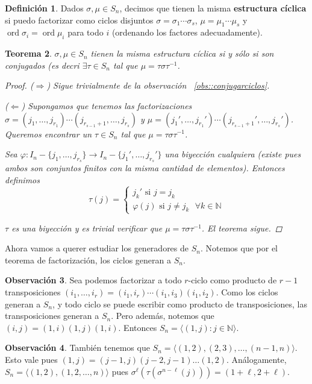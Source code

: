\documentclass[12pt]{book}
\newtheorem{teo}{Teorema}[section]
\theoremstyle{definition}
\newtheorem{obs}[teo]{Observación}
\newtheorem{defn}[teo]{Definición}
\newcommand{\NN}{\mathbb{N}}
\DeclareMathOperator{\ord}{ord}
\begin{document}
\begin{defn}
Dados $\sigma,\mu\in S_n$, decimos que tienen la misma \textbf{estructura cíclica} si puedo factorizar como ciclos disjuntos $\sigma = \sigma_1\cdots \sigma_s$, $\mu = \mu_1\cdots \mu_s$ y $\ord \sigma_i = \ord \mu_i$ para todo $i$ (ordenando los factores adecuadamente).
\end{defn}

\begin{teo}
$\sigma,\mu\in S_n$ tienen la misma estructura cíclica si y sólo si son conjugados (es decri $\exists \tau\in S_n$ tal que $\mu = \tau\sigma\tau^{-1}$.
\begin{proof}
($\Longrightarrow$) Sigue trivialmente de la observación ~\ref{obs::conjugarciclos}.

($\Longleftarrow$) Supongamos que tenemos las factorizaciones $\sigma = (j_1,\ldots , j_{r_1})\cdots (j_{r_{s-1}+1},\ldots , j_{r_s})$ y $\mu = (j_1',\ldots , j_{r_1}')\cdots (j_{r_{s-1}+1}',\ldots , j_{r_s}')$. Queremos encontrar un $\tau\in S_n$ tal que $\mu = \tau\sigma\tau^{-1}$.

Sea $\varphi: I_n - \{j_1,\ldots ,j_{r_s}\}\to I_n-\{j_1',\ldots , j_{r_s}'\}$ una biyección cualquiera (existe pues ambos son conjuntos finitos con la misma cantidad de elementos). Entonces definimos $$\tau(j) = \begin{cases}j_k' \text{ si } j=j_k \\ \varphi(j) \text{ si } j\neq j_k \text{ }\forall k\in\NN\end{cases}$$

$\tau$ es una biyección y es trivial verificar que $\mu = \tau \sigma\tau^{-1}$. El teorema sigue.
\end{proof}
\end{teo}

Ahora vamos a querer estudiar los generadores de $S_n$. Notemos que por el teorema de factorización, los ciclos generan a $S_n$.

\begin{obs}
Sea podemos factorizar a todo $r$-ciclo como producto de $r-1$ transposiciones $(i_1,\ldots , i_r) = (i_1,i_r)\cdots (i_1,i_3)(i_1,i_2)$. Como los ciclos generan a $S_n$, y todo ciclo se puede escribir como producto de transposiciones, las transposiciones generan a $S_n$. Pero además, notemos que $(i,j) = (1,i)(1,j)(1,i)$. Entonces $S_n = \langle (1,j) : j\in\NN \rangle$.
\end{obs}

\begin{obs}
También tenemos que $S_n = \langle (1,2), (2,3),\ldots , (n-1,n)\rangle$. Esto vale pues $(1,j)=(j-1,j)(j-2,j-1)\ldots (1,2)$. Análogamente, $S_n = \langle (1,2),(1,2,\ldots , n)\rangle$ pues $\sigma^{\ell}(\tau(\sigma^{n-\ell}(j))) = (1+\ell,2+\ell)$.
\end{obs}
\end{document}
